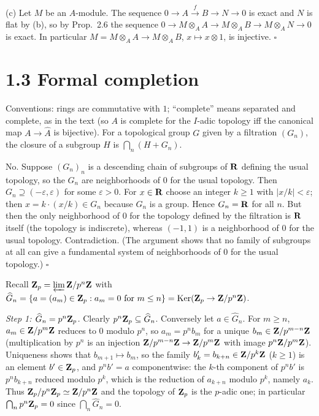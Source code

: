 \documentclass[11pt]{article}
\begin{document}
(c) Let $M$ be an $A$-module. The sequence $0\to A\xrightarrow{f}B\to N\to0$ is exact and $N$ is flat by (b), so by Prop.~2.6 the sequence $0\to M\otimes_AA\to M\otimes_AB\to M\otimes_AN\to0$ is exact. In particular $M=M\otimes_AA\to M\otimes_AB$, $x\mapsto x\otimes1$, is injective. \hfill$\square$

\section*{1.3 Formal completion}

Conventions: rings are commutative with $1$; ``complete'' means separated and complete, as in the text (so $A$ is complete for the $I$-adic topology iff the canonical map $A\to\widehat{A}$ is bijective). For a topological group $G$ given by a filtration $(G_n)$, the closure of a subgroup $H$ is $\bigcap_n(H+G_n)$.

\pf
No. Suppose $(G_n)_n$ is a descending chain of subgroups of $\mathbf R$ defining the usual topology, so the $G_n$ are neighborhoods of $0$ for the usual topology. Then $G_n\supseteq(-\varepsilon,\varepsilon)$ for some $\varepsilon>0$. For $x\in\mathbf R$ choose an integer $k\ge1$ with $|x/k|<\varepsilon$; then $x=k\cdot(x/k)\in G_n$ because $G_n$ is a group. Hence $G_n=\mathbf R$ for all $n$. But then the only neighborhood of $0$ for the topology defined by the filtration is $\mathbf R$ itself (the topology is indiscrete), whereas $(-1,1)$ is a neighborhood of $0$ for the usual topology. Contradiction. (The argument shows that no family of subgroups at all can give a fundamental system of neighborhoods of $0$ for the usual topology.) \hfill$\square$

\pf
Recall $\mathbf Z_p=\varprojlim\mathbf Z/p^n\mathbf Z$ with $\widehat{G}_n=\{a=(a_m)\in\mathbf Z_p: a_m=0\text{ for }m\le n\}=\operatorname{Ker}(\mathbf Z_p\to\mathbf Z/p^n\mathbf Z)$.

\emph{Step 1: $\widehat{G}_n=p^n\mathbf Z_p$.} Clearly $p^n\mathbf Z_p\subseteq\widehat{G}_n$. Conversely let $a\in\widehat{G}_n$. For $m\ge n$, $a_m\in\mathbf Z/p^m\mathbf Z$ reduces to $0$ modulo $p^n$, so $a_m=p^nb_m$ for a unique $b_m\in\mathbf Z/p^{m-n}\mathbf Z$ (multiplication by $p^n$ is an injection $\mathbf Z/p^{m-n}\mathbf Z\to\mathbf Z/p^m\mathbf Z$ with image $p^n\mathbf Z/p^m\mathbf Z$). Uniqueness shows that $b_{m+1}\mapsto b_m$, so the family $b'_k=b_{k+n}\in\mathbf Z/p^k\mathbf Z$ ($k\ge1$) is an element $b'\in\mathbf Z_p$, and $p^nb'=a$ componentwise: the $k$-th component of $p^nb'$ is $p^nb_{k+n}$ reduced modulo $p^k$, which is the reduction of $a_{k+n}$ modulo $p^k$, namely $a_k$. Thus $\mathbf Z_p/p^n\mathbf Z_p\simeq\mathbf Z/p^n\mathbf Z$ and the topology of $\mathbf Z_p$ is the $p$-adic one; in particular $\bigcap_np^n\mathbf Z_p=0$ since $\bigcap_n\widehat{G}_n=0$.
\end{document}
